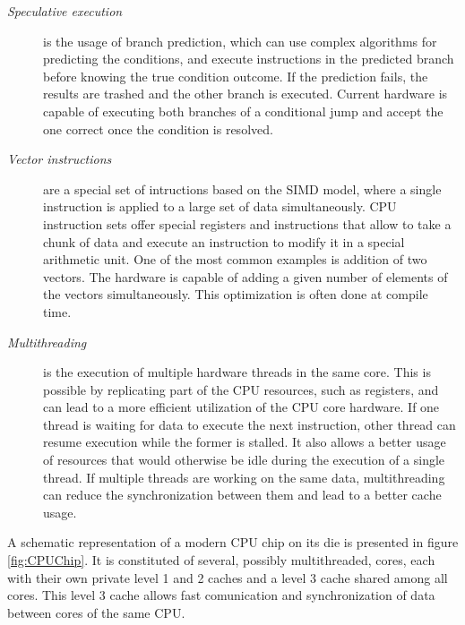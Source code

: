 \begin{description}
\begin{description}
	\end{description}
	\item[\textit{Speculative execution}] is the usage of branch prediction, which can use complex algorithms for predicting the conditions, and execute instructions in the predicted branch before knowing the true condition outcome. If the prediction fails, the results are trashed and the other branch is executed. Current hardware is capable of executing both branches of a conditional jump and accept the one correct once the condition is resolved.
	\item[\textit{Vector instructions}] are a special set of intructions based on the SIMD model, where a single instruction is applied to a large set of data simultaneously. CPU instruction sets offer special registers and instructions that allow to take a chunk of data and execute an instruction to modify it in a special arithmetic unit. One of the most common examples is addition of two vectors. The hardware is capable of adding a given number of elements of the vectors simultaneously. This optimization is often done at compile time.
	\item[\textit{Multithreading}] is the execution of multiple hardware threads in the same core. This is possible by replicating part of the CPU resources, such as registers, and can lead to a more efficient utilization of the CPU core hardware. If one thread is waiting for data to execute the next instruction, other thread can resume execution while the former is stalled. It also allows a better usage of resources that would otherwise be idle during the execution of a single thread. If multiple threads are working on the same data, multithreading can reduce the synchronization between them and lead to a better cache usage.
\end{description}

A schematic representation of a modern CPU chip on its die is presented in figure \ref{fig:CPUChip}. It is constituted of several, possibly multithreaded, cores, each with their own private level 1 and 2 caches and a level 3 cache shared among all cores. This level 3 cache allows fast comunication and synchronization of data between cores of the same CPU.


